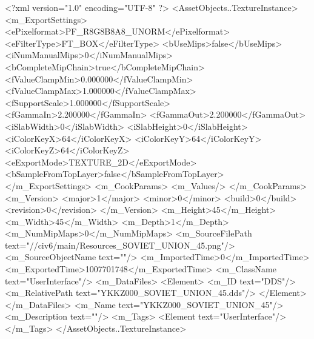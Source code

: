<?xml version="1.0" encoding="UTF-8" ?>
<AssetObjects..TextureInstance>
	<m_ExportSettings>
		<ePixelformat>PF_R8G8B8A8_UNORM</ePixelformat>
		<eFilterType>FT_BOX</eFilterType>
		<bUseMips>false</bUseMips>
		<iNumManualMips>0</iNumManualMips>
		<bCompleteMipChain>true</bCompleteMipChain>
		<fValueClampMin>0.000000</fValueClampMin>
		<fValueClampMax>1.000000</fValueClampMax>
		<fSupportScale>1.000000</fSupportScale>
		<fGammaIn>2.200000</fGammaIn>
		<fGammaOut>2.200000</fGammaOut>
		<iSlabWidth>0</iSlabWidth>
		<iSlabHeight>0</iSlabHeight>
		<iColorKeyX>64</iColorKeyX>
		<iColorKeyY>64</iColorKeyY>
		<iColorKeyZ>64</iColorKeyZ>
		<eExportMode>TEXTURE_2D</eExportMode>
		<bSampleFromTopLayer>false</bSampleFromTopLayer>
	</m_ExportSettings>
	<m_CookParams>
		<m_Values/>
	</m_CookParams>
	<m_Version>
		<major>1</major>
		<minor>0</minor>
		<build>0</build>
		<revision>0</revision>
	</m_Version>
	<m_Height>45</m_Height>
	<m_Width>45</m_Width>
	<m_Depth>1</m_Depth>
	<m_NumMipMaps>0</m_NumMipMaps>
	<m_SourceFilePath text="//civ6/main/Resources_SOVIET_UNION_45.png"/>
	<m_SourceObjectName text=""/>
	<m_ImportedTime>0</m_ImportedTime>
	<m_ExportedTime>1007701748</m_ExportedTime>
	<m_ClassName text="UserInterface"/>
	<m_DataFiles>
		<Element>
			<m_ID text="DDS"/>
			<m_RelativePath text="YKKZ000_SOVIET_UNION_45.dds"/>
		</Element>
	</m_DataFiles>
	<m_Name text="YKKZ000_SOVIET_UNION_45"/>
	<m_Description text=""/>
	<m_Tags>
		<Element text="UserInterface"/>
	</m_Tags>
</AssetObjects..TextureInstance>

